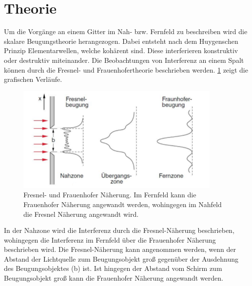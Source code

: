 \section{Theorie}
Um die Vorgänge an einem Gitter im Nah- bzw. Fernfeld zu beschreiben wird die skalare Beugungstheorie herangezogen. Dabei entsteht nach dem Huygenschen Prinzip Elementarwellen, welche kohärent sind. Diese interferieren konstruktiv oder destruktiv miteinander. Die Beobachtungen von Interferenz an einem Spalt können durch die Fresnel- und Frauenhofertheorie beschrieben werden. \cref{Theoriebild} zeigt die grafischen Verläufe.
\begin{subfigure}[c]{1.5\textwidth}
	\includegraphics[width=0.9\textwidth]{abstande.png}
	\caption{Fresnel- und Frauenhofer Näherung. Im Fernfeld kann die Frauenhofer Näherung angewandt werden, wohingegen im Nahfeld die Fresnel Näherung angewandt wird.}
	\label{Theoriebild}
\end{subfigure}
In der Nahzone wird die Interferenz durch die Fresnel-Näherung beschrieben, wohingegen die Interferenz im Fernfeld über die Frauenhofer Näherung beschrieben wird. Die Fresnel-Näherung kann angenommen werden, wenn der Abstand der Lichtquelle zum Beugungsobjekt groß gegenüber der Ausdehnung des Beugungsobjektes (b) ist. Ist hingegen der Abstand vom Schirm zum Beugungsobjekt groß kann die Frauenhofer Näherung angewandt werden.
